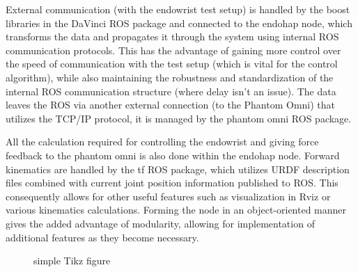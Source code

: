 External communication (with the endowrist test setup) is handled by the boost libraries in the DaVinci ROS package and connected to the endohap node, which transforms the data and propagates it through the system using internal ROS communication protocols. 
This has the advantage of gaining more control over the speed of communication with the test setup (which is vital for the control algorithm), while also maintaining the robustness and standardization of the internal ROS communication structure (where delay isn't an issue). The data leaves the ROS via another external connection (to the Phantom Omni) that utilizes the TCP/IP protocol, it is managed by the phantom omni ROS package.

All the calculation required for controlling the endowrist and giving force feedback to the phantom omni is also done within the endohap node. Forward kinematics are handled by the tf ROS package, which utilizes URDF description files combined with current joint position information published to ROS.
This consequently allows for other useful features such as visualization in Rviz or various kinematics calculations.
Forming the node in an object-oriented manner gives the added advantage of modularity, allowing for implementation of additional features as they become necessary. 

\begin{figure}[H]
\centering
{}%
\caption{simple Tikz figure}
\end{figure}
